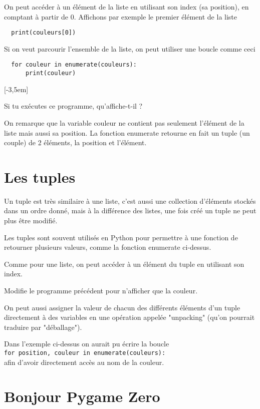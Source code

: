 \documentclass[11pt]{article}
\begin{document}
On peut accéder à un élément de la liste en utilisant son index (sa position), en comptant à partir de 0. Affichons par exemple le premier élément de la liste
\begin{lstlisting}
  print(couleurs[0])
\end{lstlisting}

Si on veut parcourir l'ensemble de la liste, on peut utiliser une boucle comme ceci
\begin{lstlisting}
  for couleur in enumerate(couleurs):
      print(couleur)
\end{lstlisting}
\marginnote{\textcolor{deepblue}{for~=~pour\\in~=~dans\\enumerate~=énumérer}}[-3,5em]

Si tu exécutes ce programme, qu'affiche-t-il ?

On remarque que la variable couleur ne contient pas seulement l'élément de la liste mais aussi sa position. La fonction enumerate retourne en fait un tuple (un couple) de 2 éléments, la position et l'élément.

\section{Les tuples}

Un tuple est très similaire à une liste, c'est aussi une collection d'éléments stockés dans un ordre donné, mais à la différence des listes, une fois créé un tuple ne peut plus être modifié.

Les tuples sont souvent utilisés en Python pour permettre à une fonction de retourner plusieurs valeurs, comme la fonction enumerate ci-dessus.

Comme pour une liste, on peut accéder à un élément du tuple en utilisant son index.

Modifie le programme précédent pour n'afficher que la couleur.

On peut aussi assigner la valeur de chacun des différents éléments d'un tuple directement à des variables en une opération appelée "unpacking" (qu'on pourrait traduire par "déballage").

Dans l'exemple ci-dessus on aurait pu écrire la boucle\\
\lstinline{for position, couleur in enumerate(couleurs):}\\
afin d'avoir directement accès au nom de la couleur.

\section{Bonjour Pygame Zero}
\end{document}
